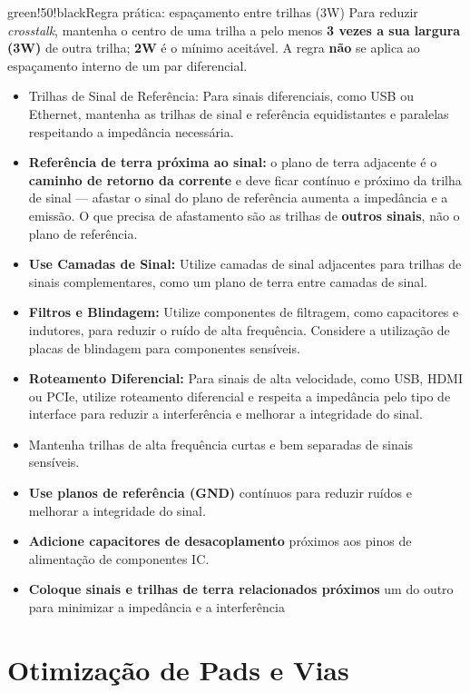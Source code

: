 \begin{quadro}{green!50!black}{Regra prática: espaçamento entre trilhas (3W)}
Para reduzir \emph{crosstalk}, mantenha o centro de uma trilha a pelo
menos \textbf{3 vezes a sua largura (3W)} de outra trilha; \textbf{2W} é
o mínimo aceitável. A regra \textbf{não} se aplica ao espaçamento
interno de um par diferencial.
\end{quadro}

\begin{itemize}
\item
  Trilhas de Sinal de Referência: Para sinais diferenciais, como USB ou Ethernet, mantenha as trilhas de sinal e referência equidistantes e paralelas respeitando a impedância necessária.
\item
  \textbf{Referência de terra próxima ao sinal:} o plano de terra adjacente é o \textbf{caminho de retorno da corrente} e deve ficar contínuo e próximo da trilha de sinal --- afastar o sinal do plano de referência aumenta a impedância e a emissão. O que precisa de afastamento são as trilhas de \textbf{outros sinais}, não o plano de referência.
\item
  \textbf{Use Camadas de Sinal:} Utilize camadas de sinal adjacentes para trilhas de sinais complementares, como um plano de terra entre camadas de sinal.
\item
  \textbf{Filtros e Blindagem:} Utilize componentes de filtragem, como capacitores e indutores, para reduzir o ruído de alta frequência. Considere a utilização de placas de blindagem para componentes sensíveis.
\item
  \textbf{Roteamento Diferencial:} Para sinais de alta velocidade, como USB, HDMI ou PCIe, utilize roteamento diferencial e respeita a impedância pelo tipo de interface para reduzir a interferência e melhorar a integridade do sinal.
\item
  Mantenha trilhas de alta frequência curtas e bem separadas de sinais sensíveis.
\item
  \textbf{Use planos de referência (GND)} contínuos para reduzir ruídos e melhorar a integridade do sinal.
\item
  \textbf{Adicione capacitores de desacoplamento} próximos aos pinos de alimentação de componentes IC.
\item
  \textbf{Coloque sinais e trilhas de terra relacionados próximos} um do outro para minimizar a impedância e a interferência
\end{itemize}

\hypertarget{otimizauxe7uxe3o-de-pads-e-vias}{%
\section{Otimização de Pads e Vias}\label{otimizauxe7uxe3o-de-pads-e-vias}}

